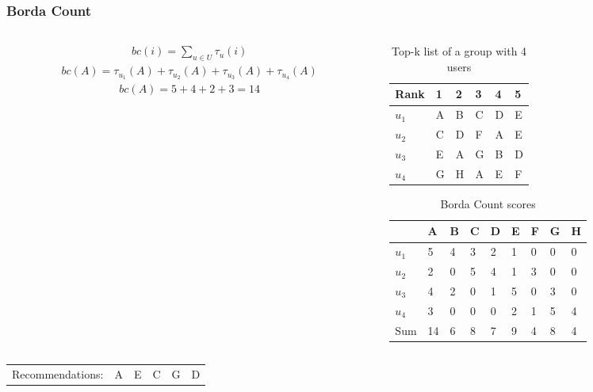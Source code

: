 \begin{frame}[t]
\frametitle{Borda Count}
\begin{columns}
\begin{column}{0.45\textwidth}
\begin{align*}
	bc(i) = \sum_{u\in U} \tau_u(i)
\end{align*}
\small
\begin{align*}
	bc(A) = \tau_{u_1}(A) + \tau_{u_2}(A) + \tau_{u_3}(A) + \tau_{u_4}(A)
\end{align*}
\normalsize
\begin{align*}
	bc(A) = 5 + 4 + 2 + 3 = 14
\end{align*}

\end{column}
\begin{column}{0.55\textwidth}
\small
\vspace{-0.5cm}
\begin{table}
\captionsetup{font=footnotesize}
\begin{tabular}{|l|lllll|} \hline
Rank  & 1 & 2 & 3 & 4 & 5 \\\hline
$u_1$ & A & B & C & D & E \\
$u_2$ & C & D & F & A & E \\
$u_3$ & E & A & G & B & D \\
$u_4$ & G & H & A & E & F\\\hline
\end{tabular}
\caption{Top-k list of a group with 4 users}
\end{table}

\vspace{-1cm}
\begin{table}
\begin{tabular}{|l|llllllll|}\hline
      & A & B & C & D & E & F & G & H \\\hline
$u_1$ & 5 & 4 & 3 & 2 & 1 & 0 & 0 & 0 \\
$u_2$ & 2 & 0 & 5 & 4 & 1 & 3 & 0 & 0 \\
$u_3$ & 4 & 2 & 0 & 1 & 5 & 0 & 3 & 0 \\
$u_4$ & 3 & 0 & 0 & 0 & 2 & 1 & 5 & 4 \\\hline
Sum	  & 14& 6 & 8 & 7 & 9 & 4 & 8 & 4 \\\hline
\end{tabular}
\caption{Borda Count scores}
\end{table}
\normalsize
\end{column}
\end{columns}
\begin{table}
\begin{tabular}{llllll}
Recommendations: & A & E & C & G & D
\end{tabular}
\end{table}
\end{frame}

%
%
%
